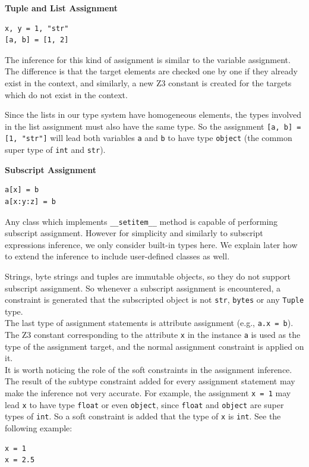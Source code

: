 \textbf{Tuple and List Assignment}
\begin{lstlisting}
x, y = 1, "str"
[a, b] = [1, 2]
\end{lstlisting}

The inference for this kind of assignment is similar to the variable assignment. The difference is that the target elements are checked one by one if they already exist in the context, and similarly, a new Z3 constant is created for the targets which do not exist in the context.

Since the lists in our type system have homogeneous elements, the types involved in the list assignment must also have the same type. So the assignment \lstinline|[a, b] = [1, "str"]| will lead both variables \lstinline|a| and \lstinline|b| to have type \lstinline|object| (the common super type of \lstinline|int| and \lstinline|str|).

\textbf{Subscript Assignment}
\begin{lstlisting}
a[x] = b
a[x:y:z] = b
\end{lstlisting}
Any class which implements \lstinline|__setitem__| method is capable of performing subscript assignment. However for simplicity and similarly to subscript expressions inference, we only consider built-in types here. We explain later how to extend the inference to include user-defined classes as well.

Strings, byte strings and tuples are immutable objects, so they do not support subscript assignment. So whenever a subscript assignment is encountered, a constraint is generated that the subscripted object is not \lstinline|str|, \lstinline|bytes| or any \lstinline|Tuple| type.\\

The last type of assignment statements is attribute assignment (e.g., \lstinline|a.x = b|). The Z3 constant corresponding to the attribute \lstinline|x| in the instance \lstinline|a| is used as the type of the assignment target, and the normal assignment constraint is applied on it. \\

It is worth noticing the role of the soft constraints in the assignment inference. The result of the subtype constraint added for every assignment statement may make the inference not very accurate. For example, the assignment \lstinline|x = 1| may lead \lstinline|x| to have type \lstinline|float| or even \lstinline|object|, since \lstinline|float| and \lstinline|object| are super types of \lstinline|int|. So a soft constraint is added that the type of \lstinline|x| is \lstinline|int|. See the following example:
\begin{lstlisting}
x = 1
x = 2.5
\end{lstlisting}

